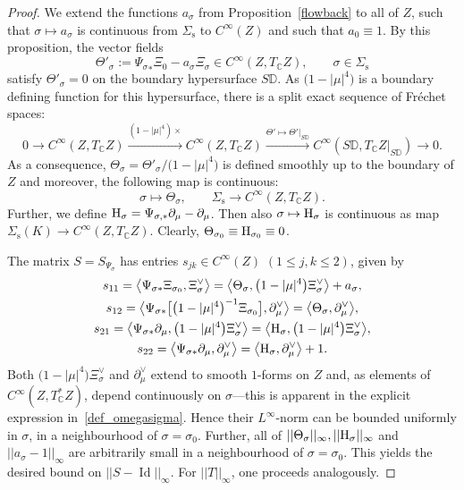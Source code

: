 \documentclass[10pt,a4paper]{amsart}
\numberwithin{equation}{section}
\theoremstyle{definition}
\newcommand{\C}{\mathbb{C}} %
\newcommand{\DD}{\mathbb{D}} %
\newcommand{\1}{{\bf 1}}
\newcommand{\Id}{\operatorname{Id}}
\begin{document}
\begin{proof}
We extend the functions $a_\sigma$ from Proposition~\ref{flowback} to all of $Z$, such that $\sigma\mapsto a_\sigma$ is continuous from $\Sigma_\mathrm{s}$ to $C^\infty(Z)$ and such that $a_0\equiv 1$. By this proposition, the vector fields
 \[
	\Theta'_\sigma:={\Psi_\sigma}_*\Xi_0 - a_\sigma \Xi_\sigma \in C^\infty(Z,T_\C Z),\qquad \sigma\in \Sigma_\mathrm{s}
\]	
satisfy $\Theta'_\sigma = 0$ on the boundary hypersurface $S\DD$. As $\bigl(1-|\mu|^4\bigr)$ is a boundary defining function for this hypersurface, there is a split exact sequence of Fr{\'e}chet spaces:
\[
0\rightarrow C^\infty(Z,T_\C Z)\xrightarrow{(1-|\mu|^4)\times }C^\infty(Z,T_\C Z)\xrightarrow{\Theta' \mapsto \Theta' |_{S\DD}} C^\infty(S\DD, T_\C Z|_{S\DD}) \rightarrow 0.
\]
As a consequence, $\Theta_\sigma =\Theta'_\sigma/ \bigl(1-|\mu|^4\bigr)$ is defined smoothly up to the boundary of $Z$ and moreover, the following map is continuous:
\[
	\sigma\mapsto \Theta_\sigma,\qquad \Sigma_\mathrm{s}\rightarrow C^\infty(Z,T_\C Z).
\]
Further, we define $\rm H_\sigma = \Psi_{\sigma,*}\partial_\mu - \partial_\mu$. Then also $\sigma\mapsto {\rm H}_\sigma$ is continuous as map $\Sigma_\mathrm{s}(K)\rightarrow C^\infty(Z,T_\C Z)$. Clearly, $\Theta_{\sigma_0} \equiv {\rm H}_{\sigma_0} \equiv 0$.


The matrix $S=S_{\Psi_\sigma}$ has entries $s_{jk}\in C^\infty(Z)$ $(1\le j,k\le 2)$, given by
\begin{gather*}
s_{11} = \big\langle \Psi_{\sigma*} \Xi_{\sigma_0}, \Xi_\sigma^\vee\big\rangle = \big\langle \Theta_\sigma,  \bigl(1-|\mu |^4\bigr)\Xi_\sigma^\vee\big\rangle + a_\sigma,\\
s_{12} = \big\langle \Psi_{\sigma*} \big[\bigl(1-|\mu|^4\bigr)^{-1} \Xi_{\sigma_0}\big], \partial_\mu^\vee\big\rangle = \big\langle \Theta_\sigma, \partial_\mu^\vee\big\rangle, \\
s_{21} = \big\langle \Psi_{\sigma*} \partial_\mu, \bigl(1-|\mu|^4\bigr)\Xi_\sigma^\vee\big\rangle = \big\langle {\rm H}_\sigma, \bigl(1-|\mu|^4\bigr) \Xi_\sigma^\vee\big\rangle,\\
s_{22} = \big\langle \Psi_{\sigma*} \partial_\mu, \partial_
\mu^\vee\big\rangle = \big\langle {\rm H}_\sigma, \partial_\mu^\vee\big\rangle + 1.
\end{gather*}
Both $\bigl(1-|\mu|^4\bigr)\Xi_\sigma^\vee$ and $\partial_\mu^\vee$ extend to smooth $1$-forms on $Z$ and, as elements of $C^\infty(Z,T^*_\C Z)$, depend continuously on $\sigma$---this is apparent in the explicit expression in~\eqref{def_omegasigma}.
 Hence their $L^\infty$-norm can be bounded uniformly in $\sigma$, in a neighbourhood of $\sigma =\sigma_0$. Further, all of $|| \Theta_\sigma ||_{\infty}, ||{\rm H}_\sigma ||_\infty $ and $||a_\sigma -1 ||_\infty$ are arbitrarily small in a neighbourhood of
$\sigma=\sigma_0$. This yields the desired bound on $||S-\Id||_\infty$. For $||T||_\infty$, one proceeds analogously.
\end{proof}
\end{document}
